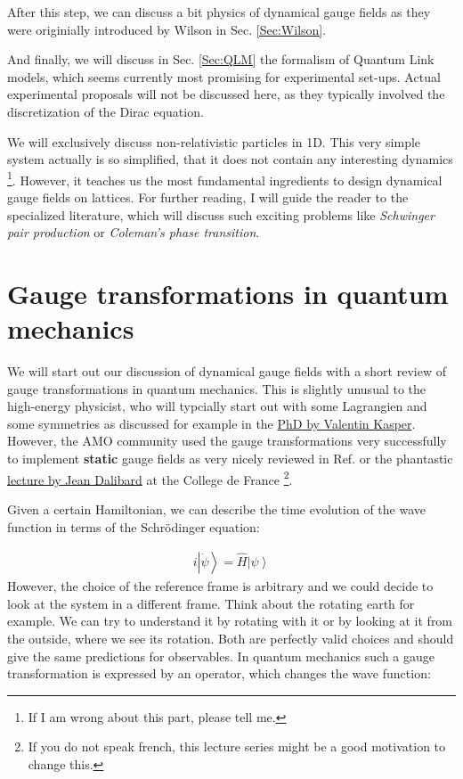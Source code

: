 \documentclass[10pt]{article}
\let\cite\citep
\providecommand\citep{\cite}
\newcommand{\ket}[1]{\ensuremath{\left|#1\right\rangle}}
\begin{document}
After this step, we can discuss a bit physics of dynamical gauge fields as they were originially introduced by Wilson in Sec. \ref{Sec:Wilson}. 

And finally, we will discuss in Sec. \ref{Sec:QLM} the formalism of Quantum Link models, which seems currently most promising for experimental set-ups. Actual experimental proposals will not be discussed here, as they typically involved the discretization of the Dirac  equation.

We will exclusively discuss non-relativistic particles in 1D. This very simple system actually is so simplified, that it does not contain any interesting dynamics \footnote{If I am wrong about this part, please tell me.}. However, it teaches us the most fundamental ingredients to design dynamical gauge fields on lattices. For further reading, I will guide the reader to the specialized literature, which will discuss such exciting problems like \textit{Schwinger pair production} \cite{Kasper_2017} or \textit{Coleman's phase transition}. 

\section{Gauge transformations in quantum mechanics}\label{sec:GaugeTransformation}

We will start out our discussion of dynamical gauge fields with a short review of gauge transformations in quantum mechanics. This is slightly unusual to the high-energy physicist, who will typcially start out with some Lagrangien and some symmetries as discussed for example in the \href{http://archiv.ub.uni-heidelberg.de/volltextserver/20372/1/Thesis.pdf}{PhD by Valentin Kasper}. However, the AMO community used the gauge transformations very successfully to implement \textbf{static} gauge fields as very nicely reviewed in Ref. \cite{Goldman_2014} or the phantastic  \href{http://www.college-de-france.fr/site/en-jean-dalibard/course-2013-2014.htm}{lecture by Jean Dalibard} at the College de France \footnote{If you do not speak french, this lecture series might be a good motivation to change this.}.

Given a certain Hamiltonian, we can describe the time evolution of the wave function in terms of the Schr\"odinger equation:

\begin{align}
i\ket{\dot{\psi}} = \hat{H}\ket{\psi}
\end{align}
However, the choice of the reference frame is arbitrary and we could decide to look at the system in a different frame. Think about the rotating earth for example. We can try to understand it by rotating with it or by looking at it from the outside, where we see its rotation. Both are perfectly valid choices and should give the same predictions for observables. In quantum mechanics such a gauge transformation is expressed by an operator, which changes the wave function:
\end{document}
